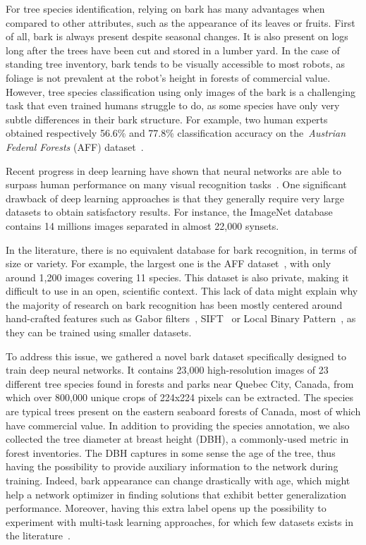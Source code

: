 \documentclass[letterpaper, 10 pt, conference]{ieeeconf}  %
\begin{document}
For tree species identification, relying on bark has many advantages when compared to other attributes, such as the appearance of its leaves or fruits. First of all, bark is always present despite seasonal changes. It is also present on logs long after the trees have been cut and stored in a lumber yard. In the case of standing tree inventory, bark tends to be visually accessible to most robots, as foliage is not prevalent at the robot's height in forests of commercial value. However, tree species classification using only images of the bark is a challenging task that even trained humans struggle to do, as some species have only very subtle differences in their bark structure. For example, two human experts obtained respectively 56.6\% and 77.8\% classification accuracy on the~\textit{Austrian Federal Forests} (AFF) dataset~\cite{Fiel}.

Recent progress in deep learning have shown that neural networks are able to surpass human performance on many visual recognition tasks~\cite{He2016}. One significant drawback of deep learning approaches is that they generally require very large datasets to obtain satisfactory results. For instance, the ImageNet database contains 14 millions images separated in almost 22,000 synsets.

In the literature, there is no equivalent database for bark recognition, in terms of size or variety. For example, the largest one is the AFF dataset~\cite{Fiel}, with only around 1,200 images covering 11 species. This dataset is also private, making it difficult to use in an open, scientific context. This lack of data might explain why the majority of research on bark recognition has been mostly centered around hand-crafted features such as Gabor filters~\cite{HuangZhi-Kai;Huang2006,1281045}, SIFT~\cite{Fiel} or Local Binary Pattern~\cite{Boudra,SulcSupervisor2014}, as they can be trained using smaller datasets.

To address this issue, we gathered a novel bark dataset specifically designed to train deep neural networks. It contains 23,000 high-resolution images of 23 different tree species found in forests and parks near Quebec City, Canada, from which over 800,000 unique crops of 224x224 pixels can be extracted. The species are typical trees present on the eastern seaboard forests of Canada, most of which have commercial value. In addition to providing the species annotation, we also collected the tree diameter at breast height (DBH), a commonly-used metric in forest inventories. The DBH captures in some sense the age of the tree, thus having the possibility to provide auxiliary information to the network during training. Indeed, bark appearance can change drastically with age, which might help a network optimizer in finding solutions that exhibit better generalization performance. Moreover, having this extra label opens up the possibility to experiment with multi-task learning approaches, for which few datasets exists in the literature~\cite{Zhang2017}.
\end{document}
